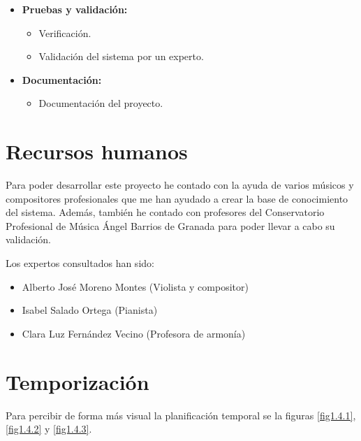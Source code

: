 \bigskip

\begin{itemize}
	\item \textbf{Pruebas y validación:}
	\begin{itemize}
		\item Verificación.
		\item Validación del sistema por un experto.
	\end{itemize}
\end{itemize}

\bigskip

\begin{itemize}
	\item \textbf{Documentación:}
	\begin{itemize}
		\item Documentación del proyecto.
	\end{itemize}
\end{itemize}

\section{Recursos humanos}

Para poder desarrollar este proyecto he contado con la ayuda de varios músicos y compositores profesionales que me han ayudado a crear la base de conocimiento del sistema. Además, también he contado con profesores del Conservatorio Profesional de Música Ángel Barrios de Granada para poder llevar a cabo su validación.

Los expertos consultados han sido:

\begin{itemize}
	\item Alberto José Moreno Montes (Violista y compositor)
	\item Isabel Salado Ortega (Pianista)
	\item Clara Luz Fernández Vecino (Profesora de armonía)
\end{itemize}

\section{Temporización}

Para percibir de forma más visual la planificación temporal se la figuras \ref{fig1.4.1}, \ref{fig1.4.2} y \ref{fig1.4.3}.

